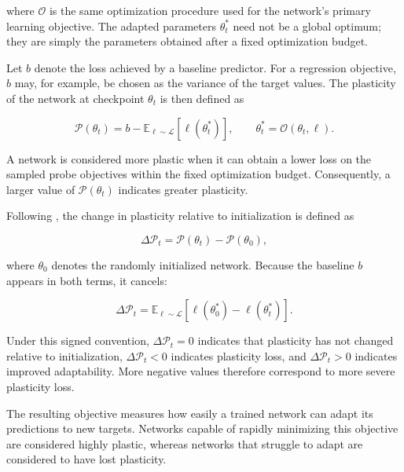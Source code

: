 where $\mathcal{O}$ is the same optimization procedure used for the
network's primary learning objective. The adapted parameters
$\theta_t^{*}$ need not be a global optimum; they are simply the
parameters obtained after a fixed optimization budget.

Let $b$ denote the loss achieved by a baseline predictor. For a
regression objective, $b$ may, for example, be chosen as the variance
of the target values. The plasticity of the network at checkpoint
$\theta_t$ is then defined as

\begin{equation}
\mathcal{P}(\theta_t)
=
b
-
\mathbb{E}_{\ell \sim \mathcal{L}}
\left[
    \ell\left(\theta_t^{*}\right)
\right],
\qquad
\theta_t^{*}
=
\mathcal{O}(\theta_t,\ell).
\label{eq:plasticity}
\end{equation}

A network is considered more plastic when it can obtain a lower loss on the sampled probe objectives within the fixed optimization budget. Consequently, a larger value of $\mathcal{P}(\theta_t)$ indicates greater plasticity.

Following \citet{lyle2023understanding}, the change in plasticity
relative to initialization is defined as

\begin{equation}
\Delta\mathcal{P}_t
=
\mathcal{P}(\theta_t)
-
\mathcal{P}(\theta_0),
\label{eq:plasticity-change}
\end{equation}

where $\theta_0$ denotes the randomly initialized network. Because the baseline $b$ appears in both terms, it cancels:

\begin{equation}
\Delta\mathcal{P}_t
=
\mathbb{E}_{\ell \sim \mathcal{L}}
\left[
    \ell\left(\theta_0^{*}\right)
    -
    \ell\left(\theta_t^{*}\right)
\right].
\end{equation}

Under this signed convention, $\Delta\mathcal{P}_t = 0$ indicates that
plasticity has not changed relative to initialization,
$\Delta\mathcal{P}_t < 0$ indicates plasticity loss, and
$\Delta\mathcal{P}_t > 0$ indicates improved adaptability.
More negative values therefore correspond to more severe plasticity
loss.

The resulting objective measures how easily a trained network can adapt its predictions to new targets. Networks capable of rapidly minimizing this objective are considered highly plastic, whereas networks that struggle to adapt are considered to have lost plasticity.

